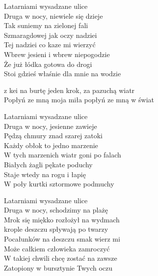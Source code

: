 \begin{text}
    Latarniami wysadzane ulice\\
    Druga w nocy, niewiele się dzieje\\
    Tak suniemy na zielonej fali\\
    Szmaragdowej jak oczy nadziei\\
    \vin Tej nadziei co kaze mi wierzyć\\
    \vin Wbrew jesieni i wbrew niepogodzie\\
    \vin Że już łódka gotowa do drogi\\
    \vin Stoi gdzieś właśnie dla mnie na wodzie

    z kei na burtę jeden krok, za pazuchą wiatr\\
    Popłyń ze mną moja miła popłyń ze mną w świat

    Latarniami wysadzane ulice\\
    Druga w nocy, jesienne zawieje\\
    Pędzą chmury znad szarej zatoki\\
    Każdy obłok to jedno marzenie\\
    \vin W tych marzenich wiatr goni po falach\\
    \vin Białych żagli pękate poduchy\\
    \vin Staje wtedy na rogu i łapię\\
    \vin W poły kurtki sztormowe podmuchy

    Latarniami wysadzane ulice\\
    Druga w nocy, schodzimy na plażę\\
    Mrok się miękko rozłożył na wydmach\\
    krople deszczu spływają po twarzy\\
    \vin Pocałunków na deszczu smak wierz mi\\
    \vin Może całkiem człowieka zamroczyć\\
    \vin W takiej chwili chcę zostać na zawsze\\
    \vin Zatopiony w bursztynie Twych oczu
\end{text}
\begin{chord}

\end{chord}